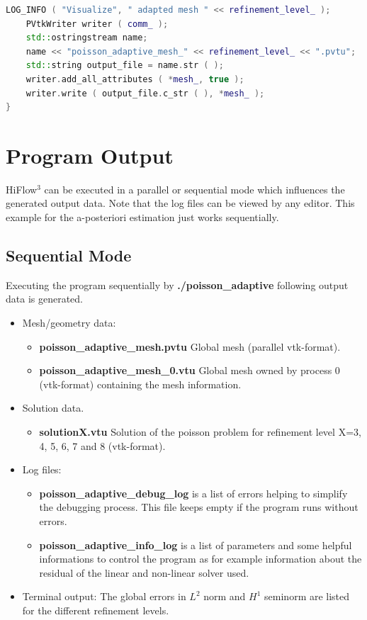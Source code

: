 \documentclass[a4paper, 11pt, twoside]{article}
\begin{document}
\begin{lstlisting}[language=C++, basicstyle={\footnotesize, \ttfamily}, keywordstyle=\color{blue}, numbers=none, tabsize=4]
    LOG_INFO ( "Visualize", " adapted mesh " << refinement_level_ );
    PVtkWriter writer ( comm_ );
    std::ostringstream name;
    name << "poisson_adaptive_mesh_" << refinement_level_ << ".pvtu";
    std::string output_file = name.str ( );
    writer.add_all_attributes ( *mesh_, true );
    writer.write ( output_file.c_str ( ), *mesh_ );
}

\end{lstlisting}

\section{Program Output}
HiFlow$^3$ can be executed in a parallel or sequential mode which influences the generated output data.
Note that the log files can be viewed by any editor. 
This example for the a-posteriori estimation just works sequentially.

\subsection{Sequential Mode} 
Executing the program sequentially by \textbf{./poisson\_adaptive} following output data is generated. 
\begin{itemize}
\item Mesh/geometry data:
\begin{itemize}
\item \textbf{poisson\_adaptive\_mesh.pvtu} Global mesh (parallel vtk-format). 
\item \textbf{poisson\_adaptive\_mesh\_0.vtu} Global mesh owned by process 0 (vtk-format) containing the mesh information.
\end{itemize}
\item Solution data. 
\begin{itemize}
\item \textbf{solutionX.vtu} Solution of the poisson problem for refinement level X=3, 4, 5, 6, 7 and 8 (vtk-format). 
\end{itemize}
\item Log files:
\begin{itemize}
\item \textbf{poisson\_adaptive\_debug\_log} is a list of errors helping to simplify the debugging process. This file keeps empty if the program runs without errors.
\item \textbf{poisson\_adaptive\_info\_log} is a list of parameters and some helpful informations to control the program as for example information 
                                         about the residual of the linear and non-linear solver used.
\end{itemize}
\item Terminal output: The global errors in $L^2$ norm and $H^1$ seminorm are listed for the different refinement levels. 
\end{itemize}
\end{document}
